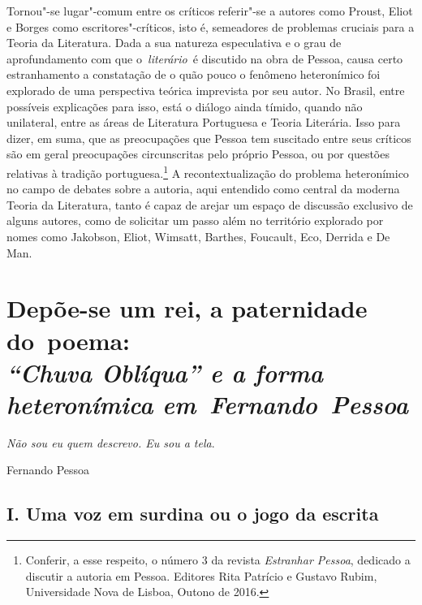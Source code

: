 Tornou"-se lugar"-comum entre os críticos referir"-se a autores como
Proust, Eliot e Borges como escritores"-críticos, isto é, semeadores de
problemas cruciais para a Teoria da Literatura. Dada a sua natureza
especulativa e o grau de aprofundamento com que o\emph{~literário}~é
discutido na obra de Pessoa, causa certo estranhamento a constatação de
o quão pouco o fenômeno heteronímico foi explorado de uma perspectiva
teórica imprevista por seu autor. No Brasil, entre possíveis explicações
para isso, está o diálogo ainda tímido, quando não unilateral, entre as
áreas de Literatura Portuguesa e Teoria Literária. Isso para dizer, em
suma, que as preocupações que Pessoa tem suscitado entre seus críticos
são em geral preocupações circunscritas pelo próprio Pessoa, ou por
questões relativas à tradição portuguesa.\footnote{Conferir, a esse
  respeito, o número 3 da revista \emph{Estranhar Pessoa}, dedicado a
  discutir a autoria em Pessoa. Editores Rita Patrício e Gustavo Rubim,
  Universidade Nova de Lisboa, Outono de 2016.} A recontextualização do
problema heteronímico no campo de debates sobre a autoria, aqui
entendido como central da moderna Teoria da Literatura, tanto é capaz de
arejar um espaço de discussão exclusivo de alguns autores, como de
solicitar um passo além no território explorado por nomes como Jakobson,
Eliot, Wimsatt, Barthes, Foucault, Eco, Derrida e De Man.

\chapter*{Depõe-se um rei, a paternidade do~poema:\\ \emph{\large``Chuva Oblíqua'' e a forma heteronímica em~Fernando~Pessoa}}


\begin{flushright}
\parbox{200pt}{\emph{Não sou eu quem descrevo. Eu sou a tela}.}

\parbox{90pt}{Fernando Pessoa}
\end{flushright}


\section*{I. Uma voz em surdina ou o jogo da escrita}

